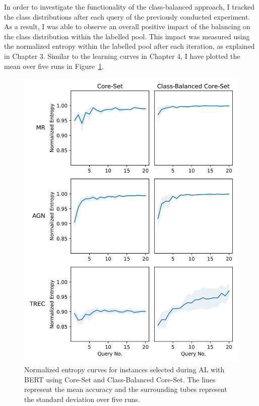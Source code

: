 \documentclass[english,bachelor,ul]{webisthesis} %
\begin{document}
In order to investigate the functionality of the class-balanced approach, I tracked the class distributions after each query of the previously conducted experiment. As a result, I was able to observe an overall positive impact of the balancing on the class distribution within the labelled pool. This impact was measured using the normalized entropy within the labelled pool after each iteration, as explained in Chapter 3. Similar to the learning curves in Chapter 4, I have plotted the mean over five runs in Figure~\ref{fig:entropy-plot}. 

\begin{figure}[htbp]
    \centering
    \includegraphics[scale=0.6]{img/entropy_plots-1.png}
    \caption{Normalized entropy curves for instances selected during AL with BERT using Core-Set and Class-Balanced Core-Set. The lines represent the mean accuracy and the surrounding tubes represent the standard deviation over five runs.}
    \label{fig:entropy-plot}
\end{figure}
\end{document}
